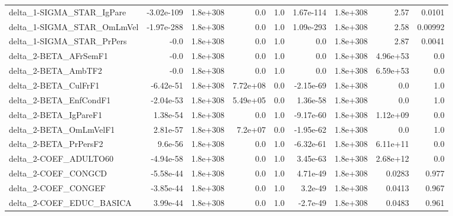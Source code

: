 \begin{tabular}{lrrrrrrrr}
delta\_1-SIGMA\_STAR\_IgPare             &  -3.02e-109 &     1.8e+308 &        0.0 &      1.0 &  1.67e-114 &    1.8e+308 &         2.57 &        0.0101 \\
delta\_1-SIGMA\_STAR\_OmLmVel            &  -1.97e-288 &     1.8e+308 &        0.0 &      1.0 &  1.09e-293 &    1.8e+308 &         2.58 &       0.00992 \\
delta\_1-SIGMA\_STAR\_PrPers             &        -0.0 &     1.8e+308 &        0.0 &      1.0 &        0.0 &    1.8e+308 &         2.87 &        0.0041 \\
delta\_2-BETA\_AFrSemF1                 &        -0.0 &     1.8e+308 &        0.0 &      1.0 &        0.0 &    1.8e+308 &     4.96e+53 &           0.0 \\
delta\_2-BETA\_AmbTF2                   &        -0.0 &     1.8e+308 &        0.0 &      1.0 &        0.0 &    1.8e+308 &     6.59e+53 &           0.0 \\
delta\_2-BETA\_CulFrF1                  &   -6.42e-51 &     1.8e+308 &   7.72e+08 &      0.0 &  -2.15e-69 &    1.8e+308 &          0.0 &           1.0 \\
delta\_2-BETA\_EnfCondF1                &   -2.04e-53 &     1.8e+308 &   5.49e+05 &      0.0 &   1.36e-58 &    1.8e+308 &          0.0 &           1.0 \\
delta\_2-BETA\_IgPareF1                 &    1.38e-54 &     1.8e+308 &        0.0 &      1.0 &  -9.17e-60 &    1.8e+308 &     1.12e+09 &           0.0 \\
delta\_2-BETA\_OmLmVelF1                &    2.81e-57 &     1.8e+308 &    7.2e+07 &      0.0 &  -1.95e-62 &    1.8e+308 &          0.0 &           1.0 \\
delta\_2-BETA\_PrPersF2                 &     9.6e-56 &     1.8e+308 &        0.0 &      1.0 &  -6.32e-61 &    1.8e+308 &     6.11e+11 &           0.0 \\
delta\_2-COEF\_ADULTO60                 &   -4.94e-58 &     1.8e+308 &        0.0 &      1.0 &   3.45e-63 &    1.8e+308 &     2.68e+12 &           0.0 \\
delta\_2-COEF\_CONGCD                   &   -5.58e-44 &     1.8e+308 &        0.0 &      1.0 &   4.71e-49 &    1.8e+308 &       0.0283 &         0.977 \\
delta\_2-COEF\_CONGEF                   &   -3.85e-44 &     1.8e+308 &        0.0 &      1.0 &    3.2e-49 &    1.8e+308 &       0.0413 &         0.967 \\
delta\_2-COEF\_EDUC\_BASICA              &    3.99e-44 &     1.8e+308 &        0.0 &      1.0 &   -2.7e-49 &    1.8e+308 &       0.0483 &         0.961 \\

\end{tabular}

